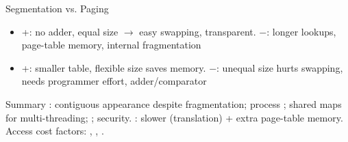 
\begin{definition}{Segmentation vs. Paging}
    \begin{itemize}
        \item {} +: no adder, equal size $\to$ easy swapping,
              transparent. $-$: longer lookups, page-table memory, internal fragmentation
        \item {} +: smaller table, flexible size saves memory.
              $-$: unequal size hurts swapping, needs programmer effort, adder/comparator
    \end{itemize}
\end{definition}

\begin{remark2}{Summary}
    : contiguous appearance despite fragmentation; process
    ; shared maps for multi-threading; ; security. : slower (translation) + extra
    page-table memory. Access cost factors: , , .
\end{remark2}

\multend

\raggedcolumns
